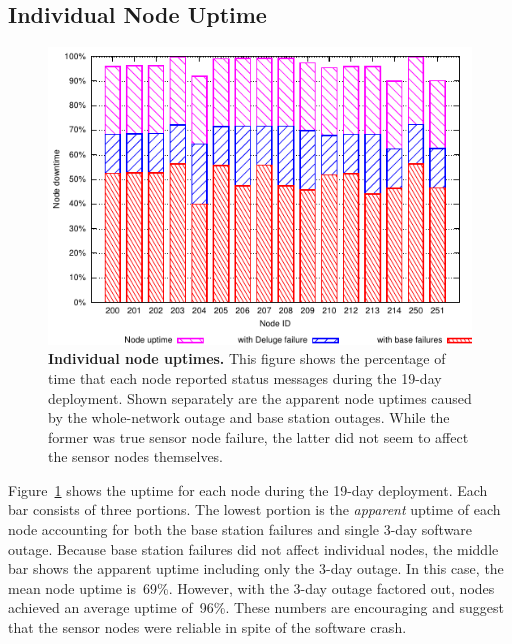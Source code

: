 \subsection{Individual Node Uptime}

\begin{figure}[t]
\begin{center}
\includegraphics[width=\hsize]{./3-evaluation/figs/nodeuptime.pdf}
\end{center}

\caption{\textbf{Individual node uptimes.} This figure shows the percentage
of time that each node reported status messages during the 19-day deployment.
Shown separately are the apparent node uptimes caused by the whole-network
outage and base station outages. While the former was true sensor node
failure, the latter did not seem to affect the sensor nodes themselves.}

\label{evaluation-fig-nodeuptime}
\end{figure}

Figure~\ref{evaluation-fig-nodeuptime} shows the uptime for each node during
the 19-day deployment. Each bar consists of three portions. The lowest
portion is the \textit{apparent} uptime of each node accounting for both the
base station failures and single 3-day software outage. Because base station
failures did not affect individual nodes, the middle bar shows the apparent
uptime including only the 3-day outage. In this case, the mean node uptime
is~69\%. However, with the 3-day outage factored out, nodes achieved an
average uptime of~96\%. These numbers are encouraging and suggest that the
sensor nodes were reliable in spite of the software crash.

